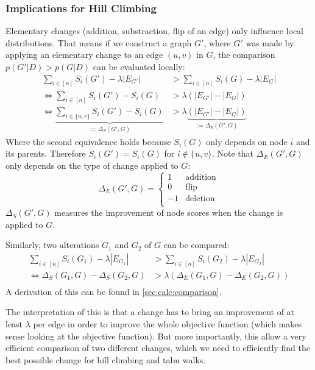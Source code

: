 \documentclass[sigconf, fleqn, prologue, dvipsnames]{acmart}
\newcommand{\set}[1]{\{#1\}}
\newcommand{\abs}[1]{\left\vert #1 \right\vert}
\begin{document}
\subsubsection{Implications for Hill Climbing}
\label{sec:methods:score:implications}
Elementary changes (addition, substraction, flip of an edge) only influence local distributions.
That means if we construct a graph $G'$, where $G'$ was made by applying an elementary change to an edge $(u, v)$ in $G$, the comparison $p(G' | D) > p(G | D)$ can be evaluated locally:
\begin{align*}
	\sum\limits_{i \in [n]} S_i(G') - \lambda \abs{E_{G'}}                               & > \sum\limits_{i \in [n]} S_i(G) - \lambda \abs{E_{G}}                  \\
	\iff\sum\limits_{i \in [n]} S_i(G') - S_i(G)                                         & > \lambda (\abs{E_{G'}} - \abs{E_{G}})                                  \\
	\iff\underbrace{\sum\limits_{i \in \set{u,v}} S_i(G') - S_i(G)}_{:= \Delta_S(G', G)} & > \lambda \underbrace{(\abs{E_{G'}} - \abs{E_{G}})}_{:= \Delta_E(G',G)}
\end{align*}
Where the second equivalence holds because $S_i(G)$ only depends on node $i$ and its parents.
Therefore $S_i(G') = S_i(G)$ for $i \notin \set{u, v}$.
Note that $\Delta_E(G',G)$ only depends on the type of change applied to $G$:
$$
	\Delta_E(G',G) = \begin{cases}
		1  & \text{addition} \\
		0  & \text{flip}     \\
		-1 & \text{deletion} \\
	\end{cases}
$$
$\Delta_S(G', G)$ measures the improvement of node scores when the change is applied to $G$.

Similarly, two alterations $G_1$ and $G_2$ of $G$ can be compared:
\begin{align*}
	\sum\limits_{i \in [n]} S_i(G_1) - \lambda \abs{E_{G_1}} & > \sum\limits_{i \in [n]} S_i(G_2) - \lambda \abs{E_{G_2}} \\
	\iff \Delta_S(G_1, G) - \Delta_S(G_2, G)                 & > \lambda \left(\Delta_E(G_1,G) - \Delta_E(G_2,G)\right)   \\
\end{align*}
A derivation of this can be found in \autoref{sec:calc:comparison}.

The interpretation of this is that a change has to bring an improvement of at least $\lambda$ per edge in order to improve the whole objective function (which makes sense looking at the objective function).
But more importantly, this allow a very efficient comparison of two different changes, which we need to efficiently find the best possible change for hill climbing and tabu walks.
\FloatBarrier
\end{document}
